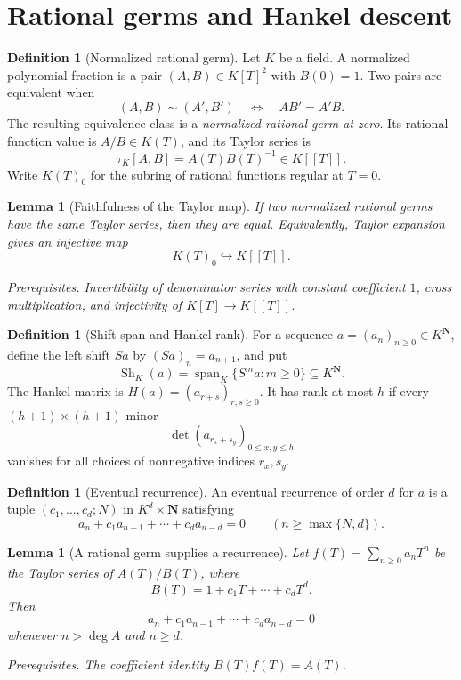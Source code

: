 \documentclass[10pt]{article}
\newtheorem{lemma}[theorem]{Lemma}
\theoremstyle{definition}
\newtheorem{definition}[theorem]{Definition}
\newcommand{\deps}[1]{\par\smallskip\noindent\textit{Prerequisites.} #1}
\begin{document}
\section{Rational germs and Hankel descent}

\begin{definition}[Normalized rational germ]
Let \(K\) be a field.  A normalized polynomial fraction is a pair
\((A,B)\in K[T]^2\) with \(B(0)=1\).  Two pairs are equivalent when
\[
 (A,B)\sim(A',B')
 \quad\Longleftrightarrow\quad AB'=A'B.
\]
The resulting equivalence class is a \emph{normalized rational germ at
zero}.  Its rational-function value is \(A/B\in K(T)\), and its Taylor
series is
\[
 \tau_K[A,B]=A(T)B(T)^{-1}\in K[[T]].
\]
Write \(K(T)_0\) for the subring of rational functions regular at \(T=0\).
\end{definition}

\begin{lemma}[Faithfulness of the Taylor map]
If two normalized rational germs have the same Taylor series, then they are
equal.  Equivalently, Taylor expansion gives an injective map
\[
 K(T)_0\hookrightarrow K[[T]].
\]
\deps{Invertibility of denominator series with constant coefficient \(1\),
cross multiplication, and injectivity of \(K[T]\to K[[T]]\).}
\end{lemma}

\begin{definition}[Shift span and Hankel rank]
For a sequence \(a=(a_n)_{n\geq0}\in K^{\mathbf N}\), define the left
shift \(Sa\) by \((Sa)_n=a_{n+1}\), and put
\[
 \operatorname{Sh}_K(a)
 =\operatorname{span}_K\{S^ma:m\geq0\}\subseteq K^{\mathbf N}.
\]
The Hankel matrix is \(H(a)=(a_{r+s})_{r,s\geq0}\).  It has rank at most
\(h\) if every \((h+1)\times(h+1)\) minor
\[
 \det(a_{r_x+s_y})_{0\leq x,y\leq h}
\]
vanishes for all choices of nonnegative indices \(r_x,s_y\).
\end{definition}

\begin{definition}[Eventual recurrence]
An eventual recurrence of order \(d\) for \(a\) is a tuple
\((c_1,\ldots,c_d;N)\) in \(K^d\times\mathbf N\) satisfying
\[
 a_n+c_1a_{n-1}+\cdots+c_da_{n-d}=0
 \qquad(n\geq\max\{N,d\}).
\]
\end{definition}

\begin{lemma}[A rational germ supplies a recurrence]
Let \(f(T)=\sum_{n\geq0}a_nT^n\) be the Taylor series of \(A(T)/B(T)\),
where
\[
 B(T)=1+c_1T+\cdots+c_dT^d.
\]
Then
\[
 a_n+c_1a_{n-1}+\cdots+c_da_{n-d}=0
 \]
whenever \(n>\deg A\) and \(n\geq d\).
\deps{The coefficient identity \(B(T)f(T)=A(T)\).}
\end{lemma}
\end{document}
